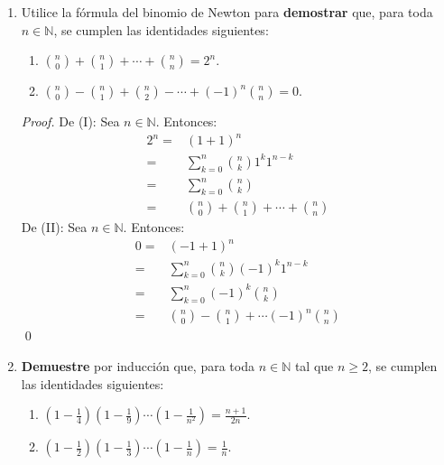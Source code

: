 \documentclass[12pt]{article}
\begin{document}
\begin{enumerate}
\begin{proof}
        De (IV): Es análogo a (III).
        \qed
    \end{proof}
    \item Utilice la fórmula del binomio de Newton para \textbf{demostrar} que, para toda $n\in\mathbb{N}$, se cumplen las identidades siguientes:
    \begin{enumerate}
        \item ${n \choose 0} + {n \choose 1} + \cdots + {n \choose n} = 2^n$.
        \item ${n \choose 0} - {n \choose 1} + {n \choose 2} - \cdots + \left(-1\right)^n {n \choose n} = 0$.
    \end{enumerate}
    \begin{proof}
        De (I): Sea $n\in\mathbb{N}$. Entonces:
        \begin{equation*}
            \begin{split}
                2^n=&(1+1)^n\\
                =&\sum_{k=0}^{n}{n \choose k}1^k1^{n-k}\\
                =&\sum_{k=0}^{n}{n \choose k}\\
                =&{n \choose 0} + {n \choose 1} + \cdots + {n \choose n}
            \end{split}
        \end{equation*}
        De (II): Sea $n\in\mathbb{N}$. Entonces:
        \begin{equation*}
            \begin{split}
                0=&(-1+1)^n\\
                =&\sum_{k=0}^{n}{n \choose k}(-1)^k1^{n-k}\\
                =&\sum_{k=0}^{n}(-1)^k{n \choose k}\\
                =&{n \choose 0} - {n \choose 1} + \cdots (-1)^n{n \choose n}
            \end{split}
        \end{equation*}
        \qed
    \end{proof}
    \item \textbf{Demuestre} por inducción que, para toda $n\in\mathbb{N}$ tal que $n\geq2$, se cumplen las identidades siguientes:
    \begin{enumerate}
        \item $\left(1-\frac{1}{4}\right)\left(1-\frac{1}{9}\right)\cdots\left(1-\frac{1}{n^2}\right)=\frac{n+1}{2n}$.
        \item $\left(1-\frac{1}{2}\right)\left(1-\frac{1}{3}\right)\cdots\left(1-\frac{1}{n}\right) = \frac{1}{n}$.

\end{enumerate}
\end{enumerate}
\end{document}

